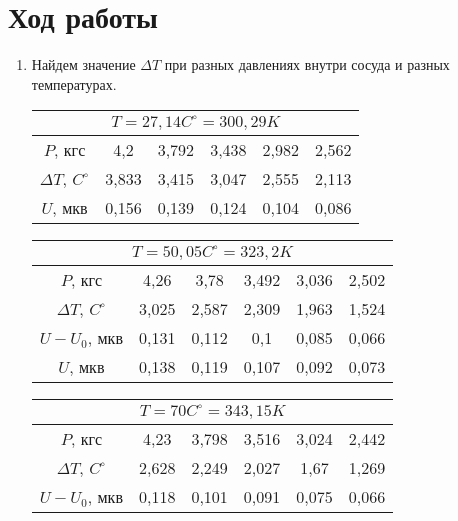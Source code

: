 \documentclass[12pt]{article}
\begin{document}
\section{Ход работы}
\begin{enumerate}
    \item Найдем значение $\Delta T$ при разных давлениях внутри сосуда и разных температурах.\newline
    \begin{center}
    		\begin{tabular}{|c|c|c|c|c|c|}
    		\hline 
    		\multicolumn{6}{|c|}{$T=27,14C^\circ = 300,29K$} \\ 
    		\hline 
   		 $P$, кгс & 4,2 & 3,792 & 3,438 & 2,982 & 2,562 \\ 
   		 \hline 
    		$\Delta T$, $C^\circ$ & 3,833 & 3,415 & 3,047 & 2,555 & 2,113 \\ 
    		\hline 
    		$U$, мкв & 0,156 & 0,139 & 0,124 & 0,104 & 0,086 \\ 
    \hline 
    \end{tabular}
    \end{center}
    \begin{center}
    		\begin{tabular}{|c|c|c|c|c|c|}
    		\hline 
    		\multicolumn{6}{|c|}{$T=50,05C^\circ = 323,2K$} \\ 
    		\hline 
   		 $P$, кгс & 4,26 & 3,78 & 3,492 & 3,036 & 2,502 \\ 
   		 \hline 
    		$\Delta T$, $C^\circ$ & 3,025  & 2,587 & 2,309 & 1,963 & 1,524 \\ 
    		\hline 
    		$U-U_0$, мкв & 0,131 & 0,112 & 0,1 & 0,085 & 0,066 \\ 
    		\hline 
    		$U$, мкв & 0,138 & 0,119 & 0,107 & 0,092 & 0,073 \\ 
    \hline 
    \end{tabular}
    \end{center}
    \begin{center}
    		\begin{tabular}{|c|c|c|c|c|c|}
    		\hline 
    		\multicolumn{6}{|c|}{$T=70C^\circ = 343,15K$} \\ 
    		\hline 
   		 $P$, кгс & 4,23 & 3,798 & 3,516 & 3,024 & 2,442 \\ 
   		 \hline 
    		$\Delta T$, $C^\circ$ & 2,628  & 2,249 & 2,027 & 1,67 & 1,269 \\ 
    		\hline 
    		$U-U_0$, мкв & 0,118 & 0,101 & 0,091 & 0,075 & 0,066 \\ 
    		\hline 

\end{tabular}
\end{center}
\end{enumerate}
\end{document}
